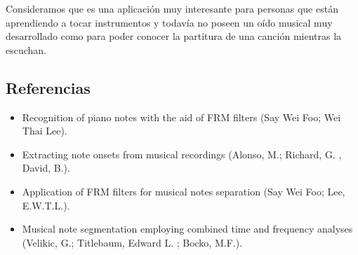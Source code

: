 \documentclass[a4paper,10pt]{article}
\begin{document}
	Consideramos que es una aplicación muy interesante para personas que están aprendiendo a tocar instrumentos y todavía no poseen un oído musical muy desarrollado como para poder conocer la partitura de una canción mientras la escuchan.

	\subsection*{Referencias}
		\begin{itemize}
			\item Recognition of piano notes with the aid of FRM filters (Say Wei Foo; Wei Thai Lee).
			\item Extracting note onsets from musical recordings (Alonso, M.; Richard, G. , David, B.).
			\item Application of FRM filters for musical notes separation (Say Wei Foo; Lee, E.W.T.L.).
			\item Musical note segmentation employing combined time and frequency analyses (Velikic, G.; Titlebaum, Edward L. ; Bocko, M.F.).
		\end{itemize}

	\clearpage
\end{document}
